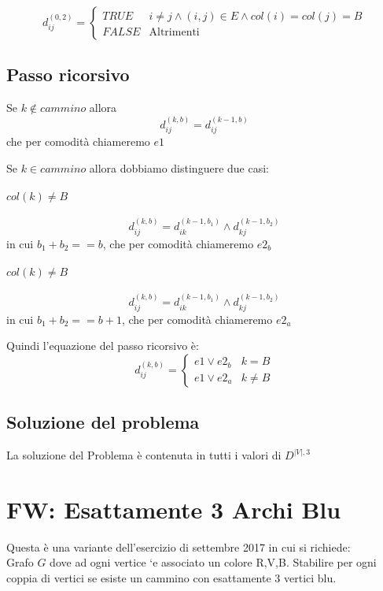 \documentclass[12pt, a4paper, openany]{book}
\begin{document}
\begin{equation*}
	d_{ij}^{(0,2)} = \begin{cases}
		TRUE  & i\neq j\land (i,j)\in E \land col(i)= col(j)= B \\
		FALSE & \text{Altrimenti}
	\end{cases}
\end{equation*}

\subsection*{Passo ricorsivo}
Se $k \notin cammino$ allora
\begin{equation*}
	d_{ij}^{(k,b)} = d_{ij}^{(k-1,b)}
\end{equation*}
che per comodità chiameremo $e1$

Se $k \in cammino$ allora dobbiamo distinguere due casi:
\paragraph{$col(k) \neq B$}
\begin{equation*}
	d_{ij}^{(k,b)} = d_{ik}^{(k-1,b_1)} \land d_{kj}^{(k-1,b_2)}
\end{equation*}
in cui $b_1 + b_2 == b$, che per comodità chiameremo $e2_b$
\paragraph{$col(k) \neq B$}
\begin{equation*}
	d_{ij}^{(k,b)} = d_{ik}^{(k-1,b_1)} \land d_{kj}^{(k-1,b_2)}
\end{equation*}
in cui $b_1 + b_2 == b+1$, che per comodità chiameremo $e2_a$

Quindi l'equazione del passo ricorsivo è:
\begin{equation*}
	d^{(k,b)}_{ij} = \begin{cases}
		e1 \lor e2_b & k=B     \\
		e1 \lor e2_a & k\neq B
	\end{cases}
\end{equation*}

\subsection*{Soluzione del problema}
La soluzione del Problema è contenuta in tutti i valori di $D^{|V|,3}$

\section{FW: Esattamente 3 Archi Blu}
Questa è una variante dell'esercizio di settembre 2017 in cui si richiede:
\\Grafo $G$ dove ad ogni vertice `e associato un colore R,V,B. Stabilire per ogni
coppia di vertici se esiste un cammino con esattamente 3 vertici blu.
\end{document}
